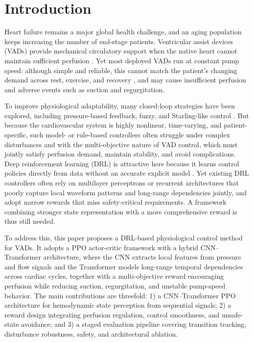 \documentclass[sigconf]{acmart}
\begin{document}


\maketitle

\section{Introduction}
Heart failure remains a major global health challenge, and an aging population keeps increasing the number of end-stage patients. Ventricular assist devices (VADs) provide mechanical circulatory support when the native heart cannot maintain sufficient perfusion \cite{b2}. Yet most deployed VADs run at constant pump speed: although simple and reliable, this cannot match the patient's changing demand across rest, exercise, and recovery \cite{b3,b2}, and may cause insufficient perfusion and adverse events such as suction and regurgitation.

To improve physiological adaptability, many closed-loop strategies have been explored, including pressure-based feedback, fuzzy, and Starling-like control \cite{b4,b5,b6,b7}. But because the cardiovascular system is highly nonlinear, time-varying, and patient-specific, such model- or rule-based controllers often struggle under complex disturbances and with the multi-objective nature of VAD control, which must jointly satisfy perfusion demand, maintain stability, and avoid complications. Deep reinforcement learning (DRL) is attractive here because it learns control policies directly from data without an accurate explicit model \cite{b8,b10,b11,b12}. Yet existing DRL controllers often rely on multilayer perceptrons or recurrent architectures that poorly capture local waveform patterns and long-range dependencies jointly, and adopt narrow rewards that miss safety-critical requirements. A framework combining stronger state representation with a more comprehensive reward is thus still needed.

To address this, this paper proposes a DRL-based physiological control method for VADs. It adopts a PPO actor-critic framework with a hybrid CNN--Transformer architecture, where the CNN extracts local features from pressure and flow signals and the Transformer models long-range temporal dependencies across cardiac cycles, together with a multi-objective reward encouraging perfusion while reducing suction, regurgitation, and unstable pump-speed behavior. The main contributions are threefold: 1) a CNN--Transformer PPO architecture for hemodynamic state perception from sequential signals; 2) a reward design integrating perfusion regulation, control smoothness, and unsafe-state avoidance; and 3) a staged evaluation pipeline covering transition tracking, disturbance robustness, safety, and architectural ablation.
\end{document}
